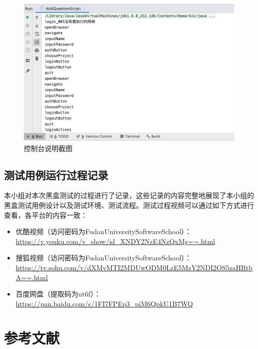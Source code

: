 \documentclass[hyperref, a4paper]{ctexart}
\providecommand{\tightlist}{%
  \setlength{\itemsep}{0pt}\setlength{\parskip}{0pt}}
\begin{document}
\begin{figure}
  \centering
  \includegraphics[scale=0.5]{./screenshots/console.jpg}
  \caption{控制台说明截图}\label{5}
\end{figure}

\hypertarget{ux6d4bux8bd5ux7528ux4f8bux8fd0ux884cux8fc7ux7a0bux8bb0ux5f55}{%
\subsection{测试用例运行过程记录}\label{ux6d4bux8bd5ux7528ux4f8bux8fd0ux884cux8fc7ux7a0bux8bb0ux5f55}}

本小组对本次黑盒测试的过程进行了记录，这些记录的内容完整地展现了本小组的黑盒测试用例设计以及测试环境、测试流程。测试过程视频可以通过如下方式进行查看，各平台的内容一致：

\begin{itemize}
\tightlist
\item
  优酷视频（访问密码为FudanUniversitySoftwareSchool）：\url{https://v.youku.com/v_show/id_XNDY2NzE4NzQxMg==.html}
\item
  搜狐视频（访问密码为FudanUniversitySoftwareSchool）：\url{https://tv.sohu.com/v/dXMvMTI2MDUwODM0LzE5MzY2NDI2OS5zaHRtbA==.html}
\item
  百度网盘（提取码为ut6f）：\url{https://pan.baidu.com/s/1FI7FPEp3_piM6QpkU1B7WQ}
\end{itemize}

\pagebreak

\hypertarget{ux53c2ux8003ux6587ux732e}{%
\section*{参考文献}\label{ux53c2ux8003ux6587ux732e}}
\end{document}
